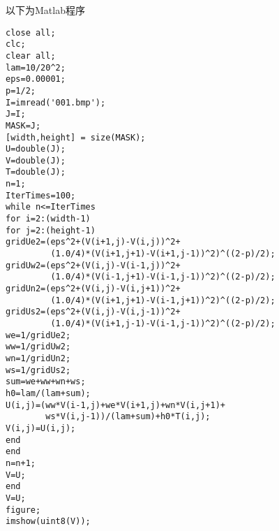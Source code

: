 以下为Matlab程序
\begin{lstlisting}[frame=trBL]
close all;
clc;
clear all;
lam=10/20^2;
eps=0.00001;
p=1/2;
I=imread('001.bmp');
J=I;
MASK=J;
[width,height] = size(MASK);
U=double(J);
V=double(J);
T=double(J);
n=1;
IterTimes=100;
while n<=IterTimes
for i=2:(width-1)
for j=2:(height-1)
gridUe2=(eps^2+(V(i+1,j)-V(i,j))^2+
         (1.0/4)*(V(i+1,j+1)-V(i+1,j-1))^2)^((2-p)/2);
gridUw2=(eps^2+(V(i,j)-V(i-1,j))^2+
         (1.0/4)*(V(i-1,j+1)-V(i-1,j-1))^2)^((2-p)/2);
gridUn2=(eps^2+(V(i,j)-V(i,j+1))^2+
         (1.0/4)*(V(i+1,j+1)-V(i-1,j+1))^2)^((2-p)/2);
gridUs2=(eps^2+(V(i,j)-V(i,j-1))^2+
         (1.0/4)*(V(i+1,j-1)-V(i-1,j-1))^2)^((2-p)/2);
we=1/gridUe2;
ww=1/gridUw2;
wn=1/gridUn2;
ws=1/gridUs2;
sum=we+ww+wn+ws;
h0=lam/(lam+sum);
U(i,j)=(ww*V(i-1,j)+we*V(i+1,j)+wn*V(i,j+1)+
		ws*V(i,j-1))/(lam+sum)+h0*T(i,j);
V(i,j)=U(i,j);
end
end
n=n+1;
V=U;
end
V=U;
figure;
imshow(uint8(V));
\end{lstlisting}



